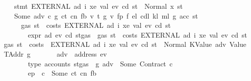 \begin{isabellebody}
\ \ \ {\isachardoublequoteopen}stmt\ {\isacharparenleft}{\kern0pt}EXTERNAL\ ad{\isacharprime}{\kern0pt}\ i\ xe\ val{\isacharparenright}{\kern0pt}\ ev\ cd\ st\ {\isacharequal}{\kern0pt}\ Normal\ {\isacharparenleft}{\kern0pt}x{\isacharcomma}{\kern0pt}\ st{\isacharprime}{\kern0pt}{\isacharparenright}{\kern0pt}{\isachardoublequoteclose}\isanewline
\ \ \ {\isacharparenleft}{\kern0pt}Some{\isacharparenright}{\kern0pt}\ adv\ c\ g\ ct\ cn\ fb{\isacharprime}{\kern0pt}\ v\ t\ g{\isacharprime}{\kern0pt}\ v{\isacharprime}{\kern0pt}\ fp\ f\ e\isactrlsub l\ cd\isactrlsub l\ k\isactrlsub l\ m\isactrlsub l\ g{\isacharprime}{\kern0pt}{\isacharprime}{\kern0pt}\ acc\ st{\isacharprime}{\kern0pt}{\isacharprime}{\kern0pt}\isanewline
\ \ \ \ \ {\isachardoublequoteopen}gas\ st\ {\isachargreater}{\kern0pt}\ costs\ {\isacharparenleft}{\kern0pt}EXTERNAL\ ad{\isacharprime}{\kern0pt}\ i\ xe\ val{\isacharparenright}{\kern0pt}\ ev\ cd\ st{\isachardoublequoteclose}\isanewline
\ \ \ \ \ \ \ {\isachardoublequoteopen}expr\ ad{\isacharprime}{\kern0pt}\ ev\ cd\ {\isacharparenleft}{\kern0pt}st{\isasymlparr}gas\ {\isacharcolon}{\kern0pt}{\isacharequal}{\kern0pt}\ gas\ st\ {\isacharminus}{\kern0pt}\ costs\ {\isacharparenleft}{\kern0pt}EXTERNAL\ ad{\isacharprime}{\kern0pt}\ i\ xe\ val{\isacharparenright}{\kern0pt}\ ev\ cd\ st{\isasymrparr}{\isacharparenright}{\kern0pt}\ {\isacharparenleft}{\kern0pt}gas\ st\ {\isacharminus}{\kern0pt}\ costs\ \ {\isacharparenleft}{\kern0pt}EXTERNAL\ ad{\isacharprime}{\kern0pt}\ i\ xe\ val{\isacharparenright}{\kern0pt}\ ev\ cd\ st{\isacharparenright}{\kern0pt}\ {\isacharequal}{\kern0pt}\ Normal\ {\isacharparenleft}{\kern0pt}{\isacharparenleft}{\kern0pt}KValue\ adv{\isacharcomma}{\kern0pt}\ Value\ TAddr{\isacharparenright}{\kern0pt}{\isacharcomma}{\kern0pt}\ g{\isacharparenright}{\kern0pt}{\isachardoublequoteclose}\isanewline
\ \ \ \ \ \ \ {\isachardoublequoteopen}adv\ {\isasymnoteq}\ address\ ev{\isachardoublequoteclose}\isanewline
\ \ \ \ \ \ \ {\isachardoublequoteopen}type\ {\isacharparenleft}{\kern0pt}accounts\ {\isacharparenleft}{\kern0pt}st{\isasymlparr}gas\ {\isacharcolon}{\kern0pt}{\isacharequal}{\kern0pt}\ g{\isasymrparr}{\isacharparenright}{\kern0pt}\ adv{\isacharparenright}{\kern0pt}\ {\isacharequal}{\kern0pt}\ Some\ {\isacharparenleft}{\kern0pt}Contract\ c{\isacharparenright}{\kern0pt}{\isachardoublequoteclose}\isanewline
\ \ \ \ \ \ \ {\isachardoublequoteopen}ep\ {\isachardollar}{\kern0pt}{\isachardollar}{\kern0pt}\ c\ {\isacharequal}{\kern0pt}\ Some\ {\isacharparenleft}{\kern0pt}ct{\isacharcomma}{\kern0pt}\ cn{\isacharcomma}{\kern0pt}\ fb{\isacharprime}{\kern0pt}{\isacharparenright}{\kern0pt}{\isachardoublequoteclose}\isanewline

\end{isabellebody}
